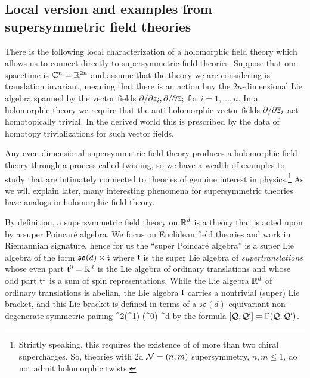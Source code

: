 \documentclass[11pt]{amsart}
\def\del{\partial}
\begin{document}
\subsection{Local version and examples from supersymmetric field theories}


There is the following local characterization of a holomorphic field theory which allows us to connect directly to supersymmetric field theories. 
Suppose that our spacetime is $\mathbb C^n = \mathbb R^{2n}$ and assume that the theory we are considering is translation invariant, meaning that there is an action buy the $2n$-dimensional Lie algebra spanned by the vector fields $\del / \del {z_i}, \del / \del {\zbar_i}$ for $i=1,\ldots,n$. 
In a holomorphic theory we require that the anti-holomorphic vector fields $\del / \del {\zbar_i}$ act homotopically trivial. 
In the derived world this is prescribed by the data of homotopy trivializations for such vector fields. 

Any even dimensional supersymmetric field theory produces a holomorphic field theory through a process called twisting,
so we have a wealth of examples to study that are intimately connected to theories of genuine interest in physics.\footnote{Strictly speaking, this requires the existence of of more than two chiral supercharges. So, theories with 2d $\mathcal N = (n,m)$ supersymmetry, $n,m \leq 1$, do not admit holomorphic twists.}
As we will explain later, many interesting phenomena for supersymmetric theories have analogs in holomorphic field theory.
 
By definition, a supersymmetric field theory on $\mathbb R^d$ is a theory that is acted upon by a super Poincar\'{e} algebra. 
We focus on Euclidean field theories and work in Riemannian signature,
hence for us the ``super Poincar\'{e} algebra'' is a super Lie algebra of the form
$\mathfrak{so}(d) \ltimes \mathfrak t$
where $\mathfrak t$ is the super Lie algebra of {\em supertranslations} whose even part $\mathfrak t^0 = \mathbb R^d$ is the Lie algebra of ordinary translations and whose odd part $\mathfrak t^1$ is a sum of spin representations. 
While the Lie algebra $\mathbb R^d$ of ordinary translations is abelian, the Lie algebra $\mathfrak t$ carries a nontrivial (super) Lie bracket,
and this Lie bracket is defined in terms of a $\mathfrak{so}(d)$-equivariant non-degenerate symmetric pairing
\beqn
\label{e:Gamma}
\Gamma {}^2(\ft^{1}) (\ft^0) \cong \RR^d 
\eeqn
by the formula $[\mathcal Q, \mathcal Q'] = \Gamma(\mathcal Q, \mathcal Q')$. 
\end{document}
